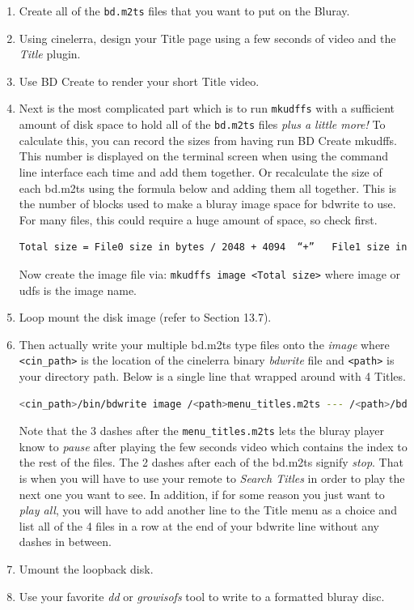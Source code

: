 \begin{enumerate}
    \item Create all of the \texttt{bd.m2ts} files that you want to put on the Bluray.
    \item Using cinelerra, design your Title page using a few seconds of video and the \textit{Title} plugin.
    \item Use BD Create to render your short Title video.
    \item Next is the most complicated part which is to run \texttt{mkudffs} with a sufficient amount of disk space to hold all of the \texttt{bd.m2ts} files \textit{plus a little more!}  To calculate this, you can record the sizes from having run BD Create mkudffs.  This number is displayed on the terminal screen when using the command line interface each time and add them together.  Or recalculate the size of each bd.m2ts using the formula below and adding them all together.  This is the number of blocks used to make a bluray image space for bdwrite to use.  For many files, this could require a huge amount of space, so check first.
    \begin{lstlisting}[language=bash]
    Total size = File0 size in bytes / 2048 + 4094  “+”   File1 size in bytes / 2048 + 4094  “+” ...
    \end{lstlisting}
    Now create the image file via:   \texttt{mkudffs image <Total size>}  where image or udfs is the image name.
    \item Loop mount the disk image (refer to Section 13.7).
    \item Then actually write your multiple bd.m2ts type files onto the \textit{image} where \texttt{<cin\_path>} is the location of the cinelerra binary \textit{bdwrite} file and \texttt{<path>} is your directory path.  Below is a single line that wrapped around with 4 Titles.
    \begin{lstlisting}[language=bash]
    <cin_path>/bin/bdwrite image /<path>menu_titles.m2ts --- /<path>/bd1.m2ts -- /<path>/bd2.m2ts -- /<path>/bd3.m2ts -- /<path>bd4.m2ts
    \end{lstlisting}
    Note that the 3 dashes after the \texttt{menu\_titles.m2ts} lets the bluray player know to \textit{pause} after playing the few seconds video which contains the index to the rest of the files.  The 2 dashes after each of the bd.m2ts signify \textit{stop}.  That is when you will have to use your remote to \textit{Search Titles} in order to play the next one you want to see.  In addition, if for some reason you just want to \textit{play all}, you will have to add another line to the Title menu as a choice and list all of the 4 files in a row at the end of your bdwrite line without any dashes in between.
    \item Umount the loopback disk.
    \item Use your favorite \textit{dd} or \textit{growisofs} tool to write to a formatted bluray disc.
\end{enumerate}

